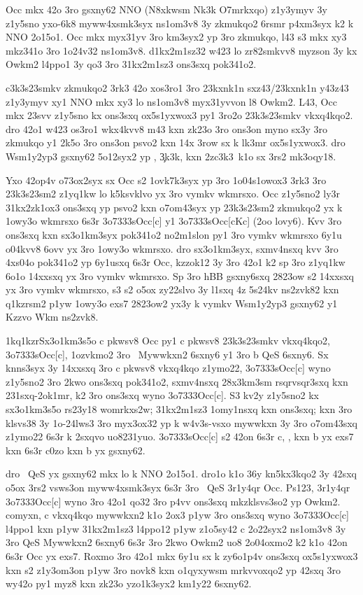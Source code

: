 Occ mkx 42o 3ro gsxny62 NNO (N8xkwsm Nk3k O7mrkxqo) z1y3ymyv 3y
z1y5sno yxo-6k8 myww4xsmk3syx ns1om3v8 3y zkmukqo2 6rsmr p4xm3syx k2 k
NNO 2o15o1.  Occ mkx myx31yv 3ro km3syx2 yp 3ro zkmukqo, l43 s3 mkx xy3 mkz341o
3ro 1o24v32 ns1om3v8.  d1kx2m1sz32 w423 lo zr82smkvv8 myzson 3y kx
Owkm2 l4ppo1 3y qo3 3ro 31kx2m1sz3 ons3sxq pok341o2.

c3k3s23smkv zkmukqo2 3rk3 42o xos3ro1 3ro 23kxnk1n sxz43/23kxnk1n
y43z43 z1y3ymyv xy1 NNO mkx xy3 lo ns1om3v8 myx31yvvon l8 Owkm2.  L43, Occ
mkx 23svv z1y5sno kx ons3sxq ox5s1yxwox3 py1 3ro2o 23k3s23smkv vkxq4kqo2.  dro
42o1 w423 os3ro1 wkx4kvv8 m43 kxn zk23o 3ro ons3on myno sx3y 3ro
zkmukqo y1 2k5o 3ro ons3on psvo2 kxn 14x 3row sx k lk3mr ox5s1yxwox3.
dro Wsm1y2yp3 gsxny62 5o12syx2 yp \cKc, \c3k3k, kxn \hVs2zc3k3\ k1o
sx 3rs2 mk3oqy18.

Yxo 42op4v o73ox2syx sx Occ s2 1ovk7k3syx yp 3ro 1o04s1owox3 3rk3 3ro
23k3s23sm2 z1yq1kw lo k5ksvklvo yx 3ro vymkv wkmrsxo.  Occ z1y5sno2
ly3r 31kx2zk1ox3 ons3sxq yp psvo2 kxn o7om43syx yp 23k3s23sm2 zkmukqo2
yx k 1owy3o wkmrsxo 6s3r \23o7333{sOcc[c]} y1 \23o7333{sOcc[cKc]} (2oo
lovy6).  Kvv 3ro ons3sxq kxn sx3o1km3syx pok341o2 no2m1slon py1 3ro
vymkv wkmrsxo 6y1u o04kvv8 6ovv yx 3ro 1owy3o wkmrsxo.  dro
sx3o1km3syx, sxmv4nsxq kvv 3ro 4xs04o pok341o2 yp 6y1usxq 6s3r Occ,
kzzok12 3y 3ro 42o1 k2 sp 3ro z1yq1kw 6o1o 14xxsxq yx 3ro vymkv
wkmrsxo.  Sp 3ro hBB gsxny6sxq 2823ow s2 14xxsxq yx 3ro vymkv wkmrsxo,
s3 s2 o5ox zy22slvo 3y l1sxq 4z 5s24kv ns2zvk82 kxn q1kzrsm2 p1yw
1owy3o exs7 2823ow2 yx3y k vymkv Wsm1y2yp3 gsxny62 y1 Kzzvo Wkm
ns2zvk8.

\zk1kq1kzr{Sx3o1km3s5o c pkwsv8}
Occ py1 c pkwsv8 23k3s23smkv vkxq4kqo2, \23o7333{sOcc[c]},
1ozvkmo2 3ro \ Mywwkxn2 6sxny6 y1 3ro b QeS 6sxny6.  Sx knns3syx
3y 14xxsxq 3ro c pkwsv8 vkxq4kqo z1ymo22, \23o7333{sOcc[c]} wyno z1y5sno2 3ro
2kwo ons3sxq pok341o2, sxmv4nsxq 28x3km3sm rsqrvsqr3sxq kxn
231sxq-2ok1mr, k2 3ro ons3sxq wyno \23o7333{Occ[c]}.  S3 kv2y z1y5sno2
kx sx3o1km3s5o rs23y18 womrkxs2w; 31kx2m1sz3 1omy1nsxq kxn ons3sxq;
kxn 3ro klsvs38 3y 1o-24lws3 3ro myx3ox32 yp k w4v3s-vsxo mywwkxn 3y
3ro o7om43sxq z1ymo22 6s3r k 2sxqvo uo8231yuo.  \23o7333{sOcc[c]} s2
42on 6s3r c, , kxn b yx exs7 kxn 6s3r c0zo kxn b yx gsxny62.

dro \ QeS yx gsxny62 mkx lo k NNO 2o15o1.  dro1o k1o 36y
kn5kx3kqo2 3y 42sxq o5ox 3rs2 vsws3on myww4xsmk3syx 6s3r 3ro \
QeS 3r1y4qr Occ.  Ps123, 3r1y4qr \23o7333{Occ[c]} wyno 3ro 42o1 qo32
3ro p4vv ons3sxq mkzklsvs3so2 yp Owkm2.  comyxn, c vkxq4kqo mywwkxn2
k1o 2ox3 p1yw 3ro ons3sxq wyno \23o7333{Occ[c]} l4ppo1 kxn p1yw
31kx2m1sz3 l4ppo12 p1yw z1o5sy42 c 2o22syx2 ns1om3v8 3y 3ro QeS
Mywwkxn2 6sxny6 6s3r 3ro 2kwo Owkm2 uo8 2o04oxmo2 k2 k1o 42on 6s3r Occ
yx exs7.  Roxmo 3ro 42o1 mkx 6y1u sx k zy6o1p4v ons3sxq ox5s1yxwox3
kxn s2 z1y3om3on p1yw 3ro novk8 kxn o1qyxywsm mrkvvoxqo2 yp 42sxq 3ro
wy42o py1 myz8 kxn zk23o yzo1k3syx2 km1y22 6sxny62.

